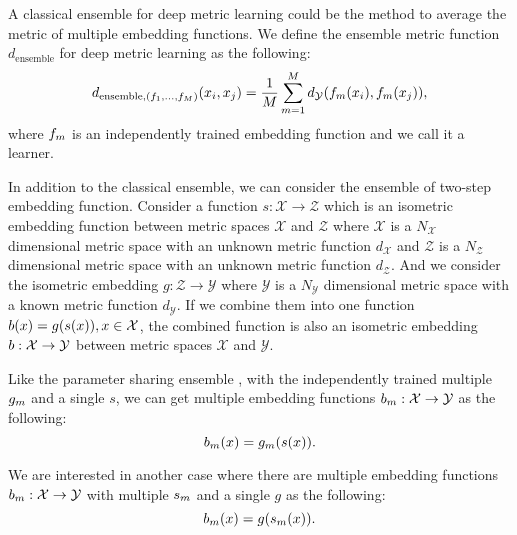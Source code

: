 \documentclass[runningheads]{llncs}
\begin{document}
A classical ensemble for deep metric learning could be the method to average the metric of multiple embedding functions.
We define the ensemble metric function $d_{\mathrm{ensemble}} $ for deep metric learning as the following:
\vspace{-3mm}
\begin{equation}
d_{\mathrm{ensemble},{(f_1,\dots,f_{\Ensemblesub})}}  (x_i,x_j )=\frac{1}{\Ensemblesub} \sum_{\ensemblesub=1}^{\Ensemblesub} d_\mathcal{Y} (f_\ensemblesub (x_i ),f_\ensemblesub (x_j)),
\label{eq:d_ensemble}
\vspace{-2mm}
\end{equation}
where $f_m$ is an independently trained embedding function and we call it a learner.

In addition to the classical ensemble, we can consider the ensemble of two-step embedding function.
Consider a function $s:\mathcal{X}  \rightarrow \mathcal{Z}$ which is an isometric embedding function
 between metric spaces $\mathcal{X} $ and $\mathcal{Z}$ where $\mathcal{X} $ is a $N_\mathcal{X}$
 dimensional metric space with an unknown metric function $d_\mathcal{X}  $ and $\mathcal{Z}$
 is a $N_\mathcal{Z} $ dimensional metric space with an unknown metric function $d_\mathcal{Z}$.
And we consider the isometric embedding $g:\mathcal{Z} \rightarrow \mathcal{Y}$ where
 $\mathcal{Y}$ is a $N_\mathcal{Y}$ dimensional metric space with a known metric function $d_\mathcal{Y}$.
If we combine them into one function $b(x)=g(s(x)),x \in \mathcal{X} $,
 the combined function is also an isometric embedding $b:\mathcal{X} \rightarrow \mathcal{Y}$
 between metric spaces $\mathcal{X} $ and $\mathcal{Y}$.

Like the parameter sharing ensemble \cite{lee2015m}, with the independently trained multiple
 $g_m$ and a single $s$, we can get multiple embedding functions $b_m:\mathcal{X} \rightarrow \mathcal{Y}$ as the following:
\vspace{-2mm}
\begin{equation}
\ensemblefunc_\ensemblesub (x)=g_\ensemblesub (s(x)) .
\label{eq:multihead}
\vspace{-2mm}
\end{equation}

We are interested in another case where there are multiple embedding functions $b_m:\mathcal{X}  \rightarrow \mathcal{Y}$ with multiple $s_m$ and a single $g$ as the following:
\vspace{-2mm}
\begin{equation}
\ensemblefunc_\ensemblesub (x)=g(s_\ensemblesub (x)) .
\vspace{-2mm}
\label{eq:m_k}
\end{equation}
\end{document}

